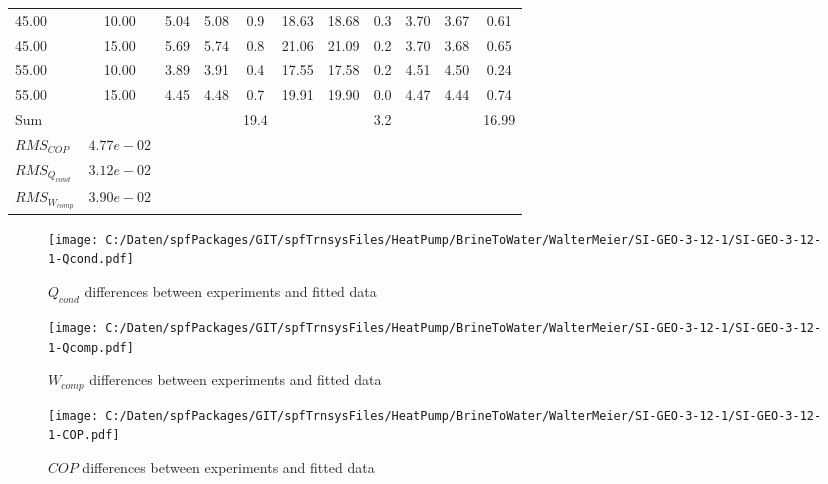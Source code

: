 \documentclass[english]{SPFShortReport}
\begin{document}
\begin{table}[!ht]
\begin{small}
\begin{center}
{\begin{tabular}{l | c c c c c c c c c c }
45.00  & 10.00 & 5.04 & 5.08 & 0.9 & 18.63 & 18.68 & 0.3 & 3.70 & 3.67 & 0.61\\ 
45.00  & 15.00 & 5.69 & 5.74 & 0.8 & 21.06 & 21.09 & 0.2 & 3.70 & 3.68 & 0.65\\ 
55.00  & 10.00 & 3.89 & 3.91 & 0.4 & 17.55 & 17.58 & 0.2 & 4.51 & 4.50 & 0.24\\ 
55.00  & 15.00 & 4.45 & 4.48 & 0.7 & 19.91 & 19.90 & 0.0 & 4.47 & 4.44 & 0.74\\ 
\hline 
 Sum &  & &  & 19.4 &  &  & 3.2 & &  & 16.99\\ 
\hline 
 $RMS_{COP}$ & $4.77e-02$ \\ 
 $RMS_{Q_{cond}}$ & $3.12e-02$ \\ 
 $RMS_{W_{comp}}$ & $3.90e-02$ \\ 
\hline
\hline
\end{tabular}
}
\label{ErrorsTable}
\end{center}
\end{small}
\end{table}
\begin{figure}[!ht]
\begin{center}
\texttt{[image: C:/Daten/spfPackages/GIT/spfTrnsysFiles/HeatPump/BrineToWater/WalterMeier/SI-GEO-3-12-1/SI-GEO-3-12-1-Qcond.pdf]}
\caption{$Q_{cond}$ differences between experiments and fitted data}
\label{QcongFig}
\end{center}
\end{figure}
\begin{figure}[!ht]
\begin{center}
\texttt{[image: C:/Daten/spfPackages/GIT/spfTrnsysFiles/HeatPump/BrineToWater/WalterMeier/SI-GEO-3-12-1/SI-GEO-3-12-1-Qcomp.pdf]}
\caption{$W_{comp}$ differences between experiments and fitted data}
\label{QcompFig}
\end{center}
\end{figure}
\begin{figure}[!ht]
\begin{center}
\texttt{[image: C:/Daten/spfPackages/GIT/spfTrnsysFiles/HeatPump/BrineToWater/WalterMeier/SI-GEO-3-12-1/SI-GEO-3-12-1-COP.pdf]}
\caption{$COP$ differences between experiments and fitted data}
\label{COPFig}
\end{center}
\end{figure}
\end{document}
